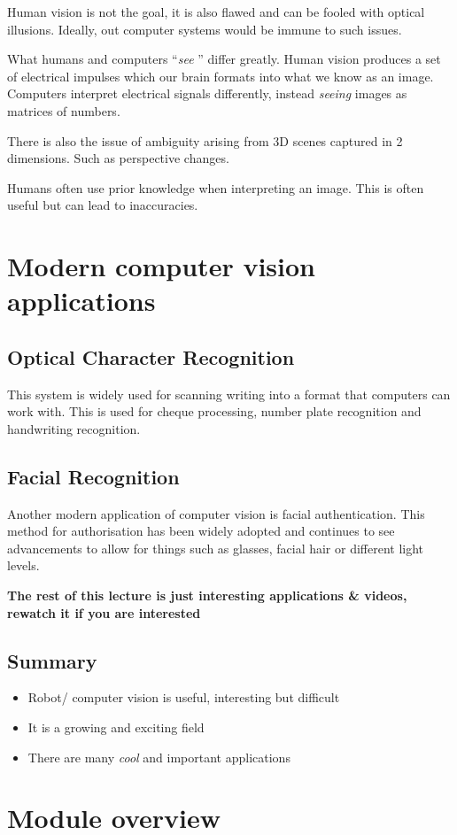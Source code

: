 \documentclass{article}
\begin{document}
Human vision is not the goal, it is also flawed and can be fooled with optical illusions. Ideally, out computer systems would be immune to such issues.

What humans and computers ``\textit{see} '' differ greatly. Human vision produces a set of electrical impulses which our brain formats into what we know as an image. Computers interpret electrical signals differently, instead \textit{seeing} images as matrices of numbers.

There is also the issue of ambiguity arising from 3D scenes captured in 2 dimensions. Such as perspective changes.


Humans often use prior knowledge when interpreting an image. This is often useful but can lead to inaccuracies.

\section{Modern computer vision applications}

\subsection{Optical Character Recognition}

This system is widely used for scanning writing into a format that computers can work with. This is used for cheque processing, number plate recognition and handwriting recognition.

\subsection{Facial Recognition}

Another modern application of computer vision is facial authentication. This method for authorisation has been widely adopted and continues to see advancements to allow for things such as glasses, facial hair or different light levels.


\textbf{The rest of this lecture is just interesting applications \& videos, rewatch it if you are interested}

\subsection{Summary}

\begin{itemize}
  \item Robot/ computer vision is useful, interesting but difficult
  \item It is a growing and exciting field
  \item There are many \textit{cool} and important applications
\end{itemize}

\section{Module overview}
\end{document}
